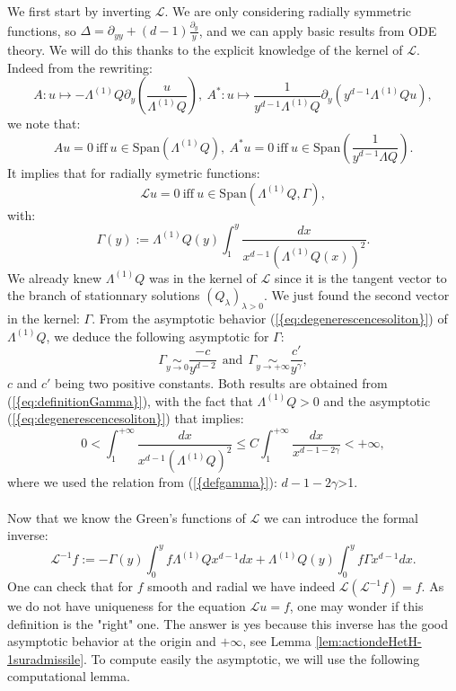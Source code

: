 \documentclass[11pt,a4paper,reqno]{amsart}
\theoremstyle{remark}
\numberwithin{equation}{section}
\begin{document}
We first start by inverting $\mathcal{L}$. We are only considering radially symmetric functions, so $\Delta=\partial_{yy}+(d-1)\frac{\partial_y}{y}$, and we can apply basic results from ODE theory. We will do this thanks to the explicit knowledge of the kernel of $\mathcal{L}$. Indeed from the rewriting:
\begin{equation}\label{eq:reecrituredeA}
A:u\mapsto -\Lambda^{(1)}Q\partial_y\left( \frac{u}{\Lambda^{(1)} Q}\right), \ A^*:u\mapsto \frac{1}{y^{d-1}\Lambda^{(1)}Q}\partial_y (y^{d-1}\Lambda^{(1)}Q u),
\end{equation}
we note that:
\begin{equation}
Au=0 \ \text{iff} \ u\in \text{Span}(\Lambda^{(1)}Q), \ A^*u=0 \ \text{iff} \ u\in \text{Span}\left( \frac{1}{y^{d-1}\Lambda Q}\right).
\end{equation}
It implies that for radially symetric functions:
\begin{equation}
\mathcal{L}u=0 \ \text{iff} \ u\in \text{Span}(\Lambda^{(1)}Q,\Gamma),
\end{equation}
with:
\begin{equation}\label{eq:definitionGamma}
\Gamma (y):=\Lambda^{(1)}Q(y) \int_1^y \frac{dx}{x^{d-1}(\Lambda^{(1)} Q(x))^2}.
\end{equation}
We already knew $\Lambda^{(1)}Q$ was in the kernel of $\mathcal{L}$ since it is the tangent vector to the branch of stationnary solutions $(Q_{\lambda})_{\lambda>0}$. We just found the second vector in the kernel: $\Gamma$. From the asymptotic behavior {{\rm (\ref{{eq:degenerescencesoliton}})}} of $\Lambda^{(1)}Q$, we deduce the following asymptotic for $\Gamma$:
\begin{equation}
\Gamma \underset{y\rightarrow 0}{\sim} \frac{-c}{y^{d-2}} \ \ \text{and} \ \ \Gamma \underset{y\rightarrow +\infty}{\sim} \frac{c'}{y^{\gamma}},
\end{equation}
$c$ and $c'$ being two positive constants. Both results are obtained from {{\rm (\ref{{eq:definitionGamma}})}}, with the fact that $\Lambda^{(1)}Q>0$ and the asymptotic {{\rm (\ref{{eq:degenerescencesoliton}})}} that implies:
$$
0<\int_1^{+\infty} \frac{dx}{x^{d-1}(\Lambda^{(1)}Q)^2} \leq C \int_1^{+\infty} \frac{dx}{x^{d-1-2\gamma}}<+\infty ,
$$
where we used the relation from {{\rm (\ref{{defgamma}})}}: $d-1-2\gamma$>1.\\
\\
Now that we know the Green's functions of $\mathcal{L}$ we can introduce the formal inverse:
\begin{equation}\label{eq:definitioninverseformel}
\mathcal{L}^{-1}f:=-\Gamma(y)\int_0^y f\Lambda^{(1)} Q x^{d-1} dx +\Lambda^{(1)}Q(y)\int_0^y f\Gamma x^{d-1} dx .
\end{equation}
One can check that for $f$ smooth and radial we have indeed $\mathcal{L}(\mathcal{L}^{-1}f)=f$. As we do not have uniqueness for the equation $\mathcal{L}u=f$, one may wonder if this definition is the "right" one. The answer is yes because this inverse has the good asymptotic behavior at the origin and $+\infty$, see Lemma \ref{lem:actiondeHetH-1suradmissile}. To compute easily the asymptotic, we will use the following computational lemma.
\end{document}
